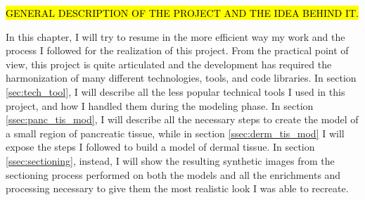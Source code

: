 \hl{GENERAL DESCRIPTION OF THE PROJECT AND THE IDEA BEHIND IT.}

In this chapter, I will try to resume in the more efficient way my work and the process I followed for the realization of this project. From the practical point of view, this project is quite articulated and the development has required the harmonization of many different technologies, tools, and code libraries. In section \ref{sec:tech_tool}, I will describe all the less popular technical tools I used in this project, and how I handled them during the modeling phase. In section \ref{ssec:panc_tis_mod}, I will describe all the necessary steps to create the model of a small region of pancreatic tissue, while in section \ref{ssec:derm_tis_mod} I will expose the steps I followed to build a model of dermal tissue. In section \ref{ssec:sectioning}, instead, I will show the resulting synthetic images from the sectioning process performed on both the models and all the enrichments and processing necessary to give them the most realistic look I was able to recreate.

